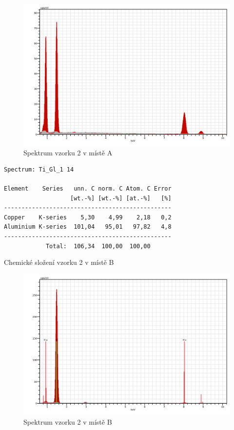 \begin{figure}[htbp]
\centering
\includegraphics[width=12cm]{graficos/vz2_a.png}
\caption{Spektrum vzorku 2 v místě A}
\label{o:vz2_a}
\end{figure}

\begin{tabulka}[htbp]
\centering
\begin{BVerbatim}
Spectrum: Ti_Gl_1 14

Element    Series   unn. C norm. C Atom. C Error
                   [wt.-%] [wt.-%] [at.-%]   [%]
------------------------------------------------
Copper    K-series    5,30    4,99    2,18   0,2
Aluminium K-series  101,04   95,01   97,82   4,8
------------------------------------------------
            Total:  106,34  100,00  100,00
\end{BVerbatim}
\caption{Chemické složení vzorku 2 v místě B}
\label{t:vz02_b}
\end{tabulka}

\begin{figure}[htbp]
\centering
\includegraphics[width=12cm]{graficos/vz2_b.png}
\caption{Spektrum vzorku 2 v místě B}
\label{o:vz2_b}
\end{figure}

